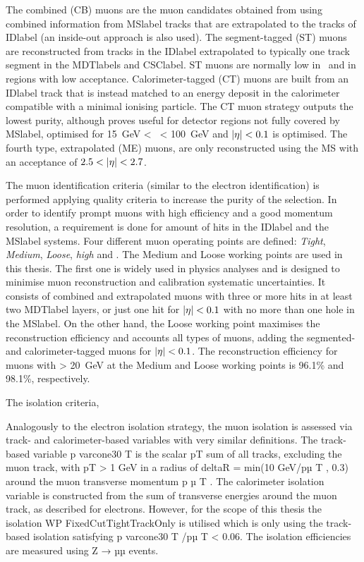 The combined (CB) muons are the muon candidates obtained from using combined information from \acrshort{MSlabel} tracks that are extrapolated to the tracks of \acrshort{IDlabel} (an inside-out approach is also used). The segment-tagged (ST) muons are reconstructed from tracks in the \acrshort{IDlabel} extrapolated to typically one track segment in the \acrshort{MDTlabel}s and \acrshort{CSClabel}. ST muons are normally low in \pT\ and in regions with low acceptance. Calorimeter-tagged (CT) muons are built from an \acrshort{IDlabel} track that is instead matched to an energy deposit in the calorimeter compatible with a minimal ionising particle. The CT muon strategy outputs the lowest purity, although proves useful for detector regions not fully covered by \acrshort{MSlabel}, optimised for 15~GeV < \pT\ < 100~GeV and $\abs{\eta}<0.1$ is optimised. The fourth type, extrapolated (ME) muons, are only reconstructed using the \acrshort{MS} with an acceptance of $2.5 < \abs{\eta} < 2.7$.

The muon identification criteria (similar to the electron identification) is performed applying quality criteria
to increase the purity of the selection. In order to identify prompt muons with high efficiency and a
good momentum resolution, a requirement is done for amount of hits in the \acrshort{IDlabel} and the \acrshort{MSlabel} systems. Four different muon operating points are defined: \textit{Tight}, \textit{Medium}, \textit{Loose}, \textit{high \pT} and . The Medium and Loose working points are used in this thesis. The first one is widely used in physics analyses and is designed to minimise muon reconstruction and calibration systematic uncertainties. It consists of combined and extrapolated muons with three or more hits in at least two \acrshort{MDTlabel} layers, or just one hit for $\abs{\eta}<0.1$ with no more than one hole in the \acrshort{MSlabel}. On the other hand, the Loose working point maximises the reconstruction efficiency and accounts all types of muons, adding the segmented- and calorimeter-tagged muons for $\abs{\eta}<0.1$. The reconstruction efficiency for muons with \pT > 20~GeV at the Medium and Loose working points is 96.1\% and 98.1\%, respectively.

The isolation criteria, 

Analogously to the electron isolation strategy, the muon isolation is assessed via track- and calorimeter-based variables with very similar definitions. The track-based variable p
varcone30
T
is the scalar pT sum
of all tracks, excluding the muon track, with pT > 1 GeV in a radius of deltaR = min(10 GeV/pµ
T
, 0.3)
around the muon transverse momentum p
µ
T
. The calorimeter isolation variable is constructed from
the sum of transverse energies around the muon track, as described for electrons. However, for the
scope of this thesis the isolation WP FixedCutTightTrackOnly is utilised which is only using the
track-based isolation satisfying p
varcone30
T
/pµ
T < 0.06. The isolation efficiencies are measured using
Z → µµ events.

